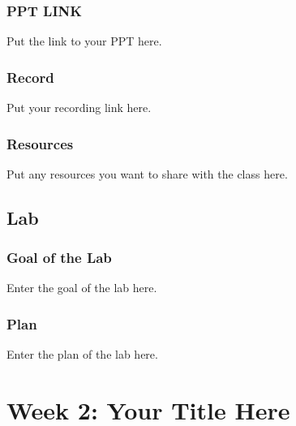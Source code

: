 \documentclass[
  letterpaper,
  oneside]{book}
\numberwithin{equation}{section}
\numberwithin{figure}{section}
\theoremstyle{break}
\begin{document}

\section*{PPT LINK}\label{ppt-link}


Put the link to your PPT here.

\section*{Record}\label{record}


Put your recording link here.

\section*{Resources}\label{resources}


Put any resources you want to share with the class here.

\chapter*{Lab}\label{lab}


\section*{Goal of the Lab}\label{goal-of-the-lab}


Enter the goal of the lab here.

\section*{Plan}\label{plan}


Enter the plan of the lab here.

\part{Week 2: Your Title Here}
\end{document}
